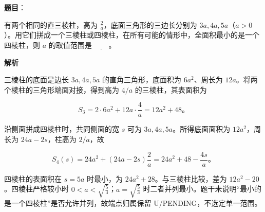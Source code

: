 \begin{answer}

\textbf{题目}：

有两个相同的直三棱柱，高为 $\frac{2}{a}$，底面三角形的三边长分别为 $3a,4a,5a$（$a>0$）。用它们拼成一个三棱柱或四棱柱，在所有可能的情形中，全面积最小的是一个四棱柱，则 $a$ 的取值范围是 $\underline{\qquad}$。
\nopagebreak[4]
\begin{center}\end{center}
\nopagebreak[4]
\textbf{解析}

三棱柱的底面是边长 $3a,4a,5a$ 的直角三角形，底面积为 $6a^2$、周长为 $12a$。将两个棱柱的三角形端面对接，得到高为 $4/a$ 的三棱柱，其表面积为

\nopagebreak[4]
\[
S_3=2\cdot6a^2+12a\cdot\frac4a=12a^2+48\mbox{。}
\]

沿侧面拼成四棱柱时，共同侧面的宽 $s$ 可为 $3a,4a,5a$。所得底面面积为 $12a^2$，周长为 $24a-2s$，柱高为 $2/a$，故

\nopagebreak[4]
\[
S_4(s)=24a^2+(24a-2s)\frac2a=24a^2+48-\frac{4s}{a}\mbox{。}
\]

四棱柱的表面积在 $s=5a$ 时最小，为 $24a^2+28$。与三棱柱比较，差为 $12a^2-20$。四棱柱严格较小时 $0<a<\sqrt{\frac53}$；$a=\sqrt{\frac53}$ 时二者并列最小。题干未说明“最小的是一个四棱柱”是否允许并列，故端点归属保留 U/PENDING，不选定单一范围。


\end{answer}

